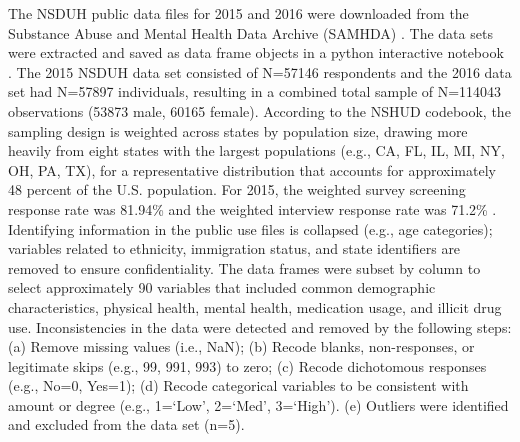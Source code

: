 \documentclass[sigconf]{acmart}
\begin{document}
The NSDUH public data files for 2015 and 2016 were downloaded from the
Substance Abuse and Mental Health Data Archive (SAMHDA) \cite{samhsa18}. 
The data sets were extracted and saved as data frame objects in a python 
interactive notebook \cite{mckinney17, vanderplas17}. The 2015 NSDUH data 
set consisted of N=57146 respondents and the 2016 data set had N=57897 
individuals, resulting in a combined total sample of N=114043 observations 
(53873 male, 60165 female). According to the NSHUD codebook, the sampling 
design is weighted across states by population size, drawing more heavily 
from eight states with the largest populations (e.g., CA, FL, IL, MI, NY, OH, 
PA, TX), for a representative distribution that accounts for approximately 
48 percent of the U.S. population. For 2015, the weighted survey screening 
response rate  was 81.94\% and the weighted interview response rate was 71.2\% 
\cite{samhsa18}. Identifying information in the public use files is collapsed 
(e.g., age categories); variables related to ethnicity, immigration status, 
and state identifiers are removed to ensure confidentiality. The data frames 
were subset by column to select approximately 90 variables that included 
common demographic characteristics, physical health, mental health, 
medication usage, and illicit drug use. Inconsistencies in the data were 
detected and removed by the following steps: (a) Remove missing values 
(i.e., NaN); (b) Recode blanks, non-responses, or legitimate skips 
(e.g., 99, 991, 993) to zero; (c) Recode dichotomous responses 
(e.g., No=0, Yes=1); (d) Recode categorical variables to be consistent with 
amount or degree  (e.g., 1=`Low', 2=`Med', 3=`High'). (e) Outliers were 
identified and excluded from the data set (n=5).

\end{document}
